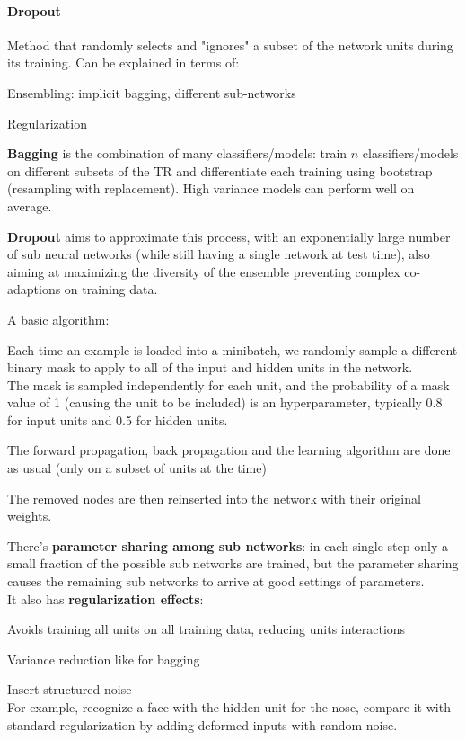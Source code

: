 \documentclass[10pt]{report}
\begin{document}
\paragraph{Dropout} Method that randomly selects and "ignores" a subset of the network units during its training. Can be explained in terms of:
\begin{list}{}{}
	\item Ensembling: implicit bagging, different sub-networks
	\item Regularization
\end{list}
\begin{multicols}{2}
\textbf{Bagging} is the combination of many classifiers/models: train $n$ classifiers/models on different subsets of the TR and differentiate each training using bootstrap (resampling with replacement). High variance models can perform well on average.
\columnbreak

\textbf{Dropout} aims to approximate this process, with an exponentially large number of sub neural networks (while still having a single network at test time), also aiming at maximizing the diversity of the ensemble preventing complex co-adaptions on training data.
\end{multicols}
A basic algorithm:
\begin{list}{}{}
	\item Each time an example is loaded into a minibatch, we randomly sample a different binary mask to apply to all of the input and hidden units in the network.\\
	The mask is sampled independently for each unit, and the probability of a mask value of 1 (causing the unit to be included) is an hyperparameter, typically 0.8 for input units and 0.5 for hidden units.
	\item The forward propagation, back propagation and the learning algorithm are done as usual (only on a subset of units at the time)
	\item The removed nodes are then reinserted into the network with their original weights.
\end{list}
There's \textbf{parameter sharing among sub networks}: in each single step only a small fraction of the possible sub networks are trained, but the parameter sharing causes the remaining sub networks to arrive at good settings of parameters.\\
It also has \textbf{regularization effects}:\begin{list}{}{}
	\item Avoids training all units on all training data, reducing units interactions
	\item Variance reduction like for bagging
	\item Insert structured noise\\
	For example, recognize a face with the hidden unit for the nose, compare it with standard regularization by adding deformed inputs with random noise.
\end{list}
\end{document}
